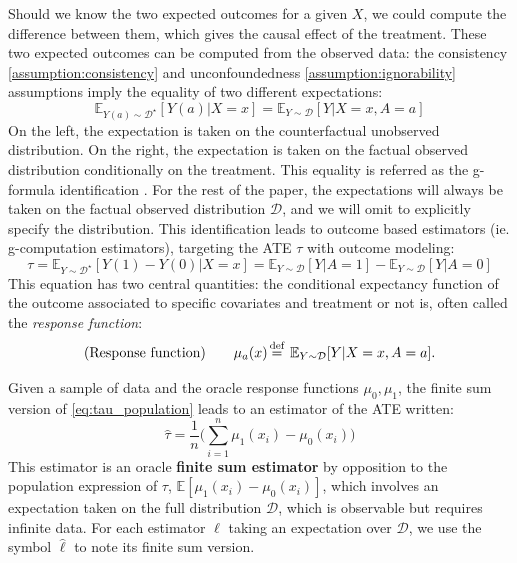 \documentclass[10pt]{article}
\newcommand\myeq{\stackrel{\mathclap{\text{def}}}{=}}
\begin{document}
\begin{multicols}{2}
    Should we know the two expected outcomes for a given $X$,
    we could compute the
    difference between them, which gives the causal effect of the treatment.
    These two expected outcomes can be computed from the observed data:
    the consistency \ref{assumption:consistency} and unconfoundedness
    \ref{assumption:ignorability} assumptions imply the equality of two different
    expectations:
    \begin{equation}\label{eq:mu_identification}
        \mathbb E_{Y(a) \sim \mathcal{D^{\star}}} [Y(a)|X=x] = \mathbb E_{Y \sim \mathcal{D}} [Y|X=x, A=a]
    \end{equation}
    On the left, the expectation is taken on the counterfactual unobserved
    distribution. On the right, the expectation is taken on the factual observed
    distribution conditionally on the treatment. This equality is referred as the
    g-formula identification \cite{robins_new_1986}. For the rest of the
    paper, the expectations will always be taken on the factual observed
    distribution $\mathcal{D}$, and we will omit
    to explicitly specify the distribution. This identification leads to outcome based estimators (ie.
    g-computation estimators\cite{snowden_implementation_2011}), targeting the
    ATE $\tau$ with outcome modeling:
    \begin{equation}
        \tau = \mathbb E_{Y \sim \mathcal{D^{\star}}}[Y(1) - Y(0)|X=x] = \mathbb E_{Y \sim \mathcal{D}}[Y|A=1] - \mathbb E_{Y \sim \mathcal{D}}[Y| A=0]
        \label{eq:tau_population}
    \end{equation}
    This equation has two central quantities: the conditional expectancy
    function of the outcome associated to specific covariates and
    treatment or not is, often called the \emph{response function}:
    \begin{equation}
        \text{(Response function)}
        \qquad
        \mu_{a}(x) \myeq \; \mathbb E_{Y \sim \mathcal{D}} [Y|X=x, A=a].
        \label{def:mu_a}
    \end{equation}

    Given a sample of data and the oracle response functions $\mu_0, \mu_1$, the
    finite sum version of \autoref{eq:tau_population} leads to an
    estimator of the ATE written:
    \begin{equation}
        \hat \tau = \frac{1}{n} \biggl(\sum_{i=1}^n \mu_{1}(x_i) - \mu_{0}(x_i) \biggr)
        \label{eq:ate_estimate}
    \end{equation}
    This estimator is an oracle \textbf{finite sum estimator} by opposition to the
    population expression of $\tau$, $\mathbb{E}[\mu_{1}(x_i) - \mu_{0}(x_i)]
    $,
    which involves an expectation taken on the full
    distribution $\mathcal D$, which is observable but requires infinite data. For
    each estimator $\ell$ taking an expectation over $\mathcal D$, we use the symbol
    $\hat \ell$ to note its finite sum version.


\end{multicols}
\end{document}
